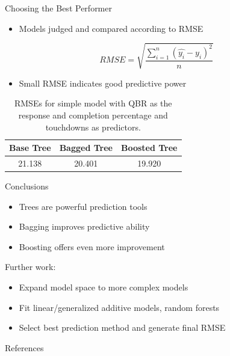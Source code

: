 \documentclass{beamer}
\begin{document}
	\begin{frame}{Choosing the Best Performer}
		\begin{itemize}
			\item Models judged and compared according to RMSE
		\end{itemize}
		\begin{equation}
			RMSE=\sqrt{\frac{\sum_{i=1}^{n}(\hat{y_{i}}-y_{i})^{2}}{n}}
		\end{equation}		
		\begin{itemize}
			\item Small RMSE indicates good predictive power
		\end{itemize}
		\begin{table}
			\centering
			\begin{tabular}{|c|c|c|}
				\hline
				Base Tree & Bagged Tree & Boosted Tree\\
				\hline
				21.138 & 20.401 & 19.920\\
				\hline
			\end{tabular}
		\caption{RMSEs for simple model with QBR as the response and completion percentage and touchdowns as predictors.}
		\end{table}
	\end{frame}

	\begin{frame}{Conclusions}
		\begin{itemize}
			\item Trees are powerful prediction tools
			\item Bagging improves predictive ability
			\item Boosting offers even more improvement
		\end{itemize}
		Further work:
		\begin{itemize}
			\item Expand model space to more complex models
			\item Fit linear/generalized additive models, random forests
			\item Select best prediction method and generate final RMSE
		\end{itemize}
	\end{frame}

	\begin{frame}{References}

	\end{frame}
	
\end{document}
